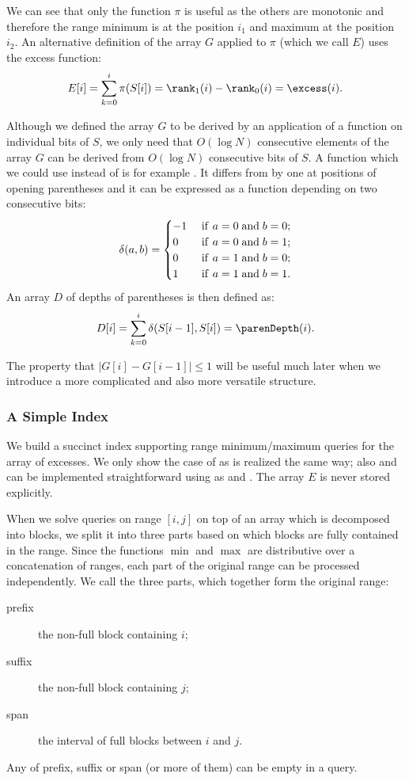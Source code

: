 We can see that only the function $\pi$ is useful as the others are monotonic and therefore the range minimum is at the position $i_1$ and maximum at the position $i_2$.
An alternative definition of the array $G$ applied to $\pi$ (which we call $E$) uses the excess function:
$$ E[i] = \sum_{k=0}^i \pi(S[i]) = \rank_1(i) - \rank_0(i) = \excess(i). $$

\bigbreak

Although we defined the array $G$ to be derived by an application of a function on individual bits of $S$, we only need that $O(\log N)$ consecutive elements of the array $G$ can be derived from $O(\log N)$ consecutive bits of $S$.
A function which we could use instead of \excess{} is for example \parenDepth{}.
It differs from \excess{} by one at positions of opening parentheses and it can be expressed as a function depending on two consecutive bits:
$$\delta(a, b) = 
\begin{cases}
	-1 &\ \textrm{\textnormal{if}}\  a = 0 \mathrel{\textrm{and}} b = 0; \\
	0 &\ \textrm{\textnormal{if}}\  a = 0 \mathrel{\textrm{and}} b = 1; \\
	0 &\ \textrm{\textnormal{if}}\  a = 1 \mathrel{\textrm{and}} b = 0; \\
	1 &\ \textrm{\textnormal{if}}\  a = 1 \mathrel{\textrm{and}} b = 1.
\end{cases} $$
An array $D$ of depths of parentheses is then defined as:
$$ D[i] = \sum_{k=0}^i \delta(S[i - 1], S[i]) = \parenDepth(i).$$

The property that $| G[i] - G[i-1] | \le 1$ will be useful much later when we introduce a more complicated and also more versatile structure.

\subsubsection{A Simple Index}\label{sss:rmq-index}

We build a succinct index supporting range minimum/maximum queries for the array of excesses.
We only show the case of \rmqi{} as \RMQi{} is realized the same way; also \rmq{} and \RMQ{} can be implemented straightforward using \rmqi{} as \RMQi{} and \excess{}.
The array $E$ is never stored explicitly.

When we solve queries on range $[i, j]$ on top of an array which is decomposed into blocks, we split it into three parts based on which blocks are fully contained in the range.
Since the functions $\min$ and $\max$ are distributive over a concatenation of ranges, each part of the original range can be processed independently.
We call the three parts, which together form the original range:
\begin{description}
	\item[prefix] the non-full block containing $i$;
	\item[suffix] the non-full block containing $j$;
	\item[span] the interval of full blocks between $i$ and $j$.
\end{description}
Any of prefix, suffix or span (or more of them) can be empty in a query.

